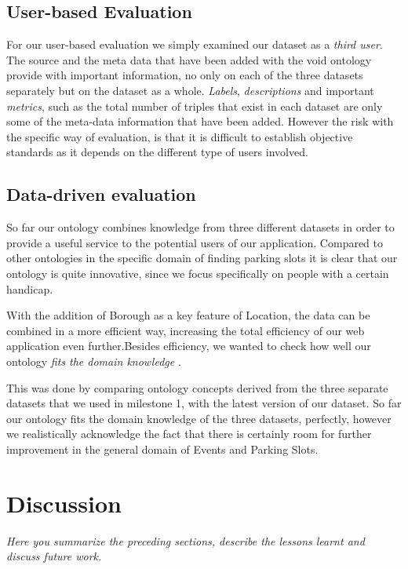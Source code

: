 \documentclass[runningheads,a4paper]{../../StyleFiles/llncs}
\begin{document}
\subsection{User-based Evaluation}
For our user-based evaluation we simply examined our dataset as a \textit{third user}. The source and the meta data that have been added with the void ontology provide with important information, no only on each of the three datasets separately but on the dataset as a whole. \textit{Labels}, \textit{descriptions} and important \textit{metrics}, such as the total number of triples that exist in each dataset are only some of the meta-data information that have been added. However the risk with the specific way of evaluation, is that it is difficult to establish objective standards as it depends on the different type of users involved.

\subsection{Data-driven evaluation}
So far our ontology combines knowledge from three different datasets in order to provide a useful service to the potential users of our application. Compared to other ontologies in the specific domain of finding parking slots it is clear that our ontology is quite innovative, since we focus specifically on people with a certain handicap. 

With the addition of Borough as a key feature of Location, the data can be combined in a more efficient way, increasing the total efficiency of our web application even further.Besides efficiency, we wanted to check how well our ontology \textit{fits the domain knowledge} \cite{brewster2004data}. 

This was done by comparing ontology concepts derived from the three separate datasets that we used in milestone 1, with the latest version of our dataset. 
So far our ontology fits the domain knowledge of the three datasets, perfectly, however we realistically acknowledge the fact that there is certainly room for further improvement in the general domain of Events and Parking Slots.


\section{Discussion}
\textit{Here you summarize the preceding sections, describe the lessons learnt and discuss future work.}





\end{document}
